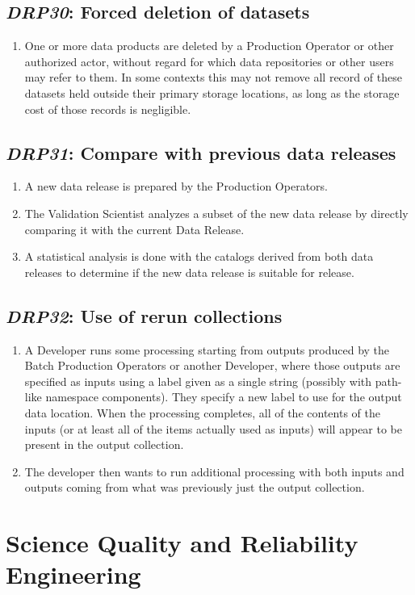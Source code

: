 \documentclass[DM,toc,lsstdraft]{lsstdoc}
\newcommand{\usecase}[3]{%
\subsection{\emph{#1}: #2}
\label{use:#1}
\begin{enumerate}[label=\alph*.]
#3
\end{enumerate}
}
\begin{document}
\usecase{DRP30}{Forced deletion of datasets}{%

\item
One or more data products are deleted by a Production Operator or other authorized actor, without regard for which data repositories or other users may refer to them.
In some contexts this may not remove all record of these datasets held outside their primary storage locations, as long as the storage cost of those records is negligible.
}

\usecase{DRP31}{Compare with previous data releases}{%

\item
A new data release is prepared by the Production Operators.

\item
The Validation Scientist analyzes a subset of the new data release by directly comparing it with the current Data Release.

\item
A statistical analysis is done with the catalogs derived from both data releases to determine if the new data release is suitable for release.

}

\usecase{DRP32}{Use of rerun collections}{%

\item
A Developer runs some processing starting from outputs produced by the Batch Production Operators or another Developer, where those outputs are specified as inputs using a label given as a single string (possibly with path-like namespace components).
They specify a new label to use for the output data location.
When the processing completes, all of the contents of the inputs (or at least all of the items actually used as inputs) will appear to be present in the output collection.

\item
The developer then wants to run additional processing with both inputs and outputs coming from what was previously just the output collection.

}

\section{Science Quality and Reliability Engineering}
\end{document}
